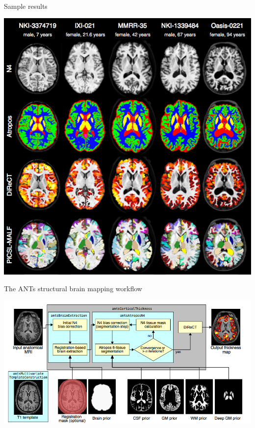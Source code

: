 \documentclass[ignorenonframetext,]{beamer}
\begin{document}
\begin{frame}{Sample results}

\includegraphics{./evaluation/figures/components.png}

\end{frame}

\begin{frame}{The ANTs structural brain mapping workflow}

\includegraphics{./evaluation/figures/pipeline.png}

\end{frame}
\end{document}
